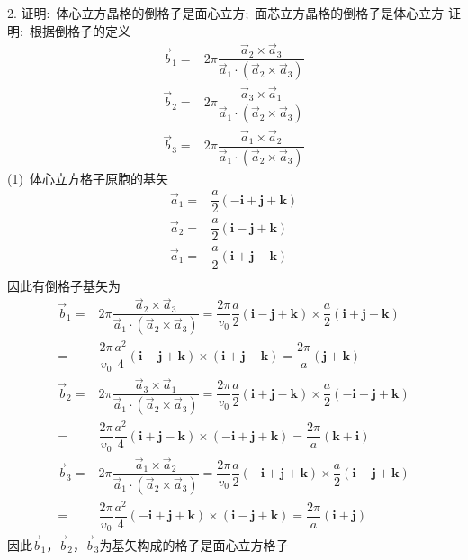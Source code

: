 2. 证明:~体心立方晶格的倒格子是面心立方;~面芯立方晶格的倒格子是体心立方
证明:~根据倒格子的定义
\begin{displaymath}
	\begin{aligned}
		\vec b_1=&2\pi\dfrac{\vec a_2\times\vec a_3}{\vec a_1\cdot(\vec a_2\times\vec a_3)}\\
		\vec b_2=&2\pi\dfrac{\vec a_3\times\vec a_1}{\vec a_1\cdot(\vec a_2\times\vec a_3)}\\
		\vec b_3=&2\pi\dfrac{\vec a_1\times\vec a_2}{\vec a_1\cdot(\vec a_2\times\vec a_3)}
	\end{aligned}
\end{displaymath}
(1)~体心立方格子原胞的基矢
\begin{displaymath}
	\begin{aligned}
		\vec a_1=&\dfrac{a}2(-\mathbf{i}+\mathbf{j}+\mathbf{k})\\
		\vec a_2=&\dfrac{a}2(\mathbf{i}-\mathbf{j}+\mathbf{k})\\
		\vec a_1=&\dfrac{a}2(\mathbf{i}+\mathbf{j}-\mathbf{k})\\
	\end{aligned}
\end{displaymath}
因此有倒格子基矢为
\begin{displaymath}
	\begin{aligned}
		\vec b_1=&2\pi\dfrac{\vec a_2\times\vec a_3}{\vec a_1\cdot(\vec a_2\times\vec a_3)}=\dfrac{2\pi}{v_0}\dfrac{a}2(\mathbf{i}-\mathbf{j}+\mathbf{k})\times\dfrac{a}2(\mathbf{i}+\mathbf{j}-\mathbf{k})\\
		=&\dfrac{2\pi}{v_0}\dfrac{a^2}4(\mathbf{i}-\mathbf{j}+\mathbf{k})\times(\mathbf{i}+\mathbf{j}-\mathbf{k})=\dfrac{2\pi}a(\mathbf{j}+\mathbf{k})\\
		\vec b_2=&2\pi\dfrac{\vec a_3\times\vec a_1}{\vec a_1\cdot(\vec a_2\times\vec a_3)}=\dfrac{2\pi}{v_0}\dfrac{a}2(\mathbf{i}+\mathbf{j}-\mathbf{k})\times\dfrac{a}2(-\mathbf{i}+\mathbf{j}+\mathbf{k})\\
		=&\dfrac{2\pi}{v_0}\dfrac{a^2}4(\mathbf{i}+\mathbf{j}-\mathbf{k})\times(-\mathbf{i}+\mathbf{j}+\mathbf{k})=\dfrac{2\pi}a(\mathbf{k}+\mathbf{i})\\
		\vec b_3=&2\pi\dfrac{\vec a_1\times\vec a_2}{\vec a_1\cdot(\vec a_2\times\vec a_3)}=\dfrac{2\pi}{v_0}\dfrac{a}2(-\mathbf{i}+\mathbf{j}+\mathbf{k})\times\dfrac{a}2(\mathbf{i}-\mathbf{j}+\mathbf{k})\\
		=&\dfrac{2\pi}{v_0}\dfrac{a^2}4(-\mathbf{i}+\mathbf{j}+\mathbf{k})\times(\mathbf{i}-\mathbf{j}+\mathbf{k})=\dfrac{2\pi}a(\mathbf{i}+\mathbf{j})
	\end{aligned}
\end{displaymath}
因此$\vec b_1$，$\vec b_2$，$\vec b_3$为基矢构成的格子是面心立方格子

